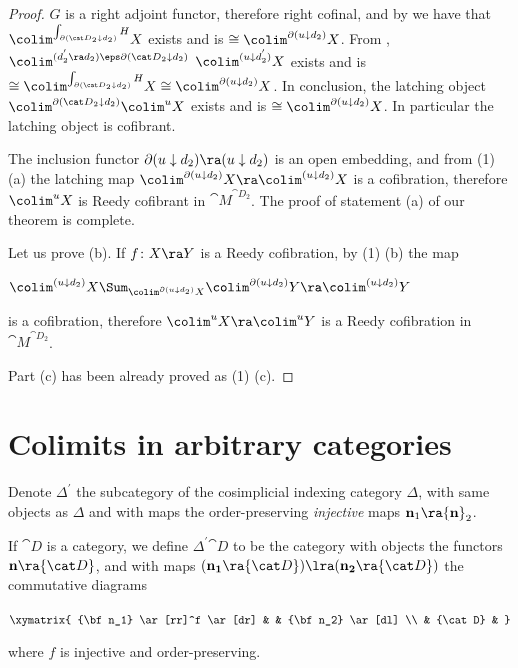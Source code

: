 \begin{proof}
$G$ is a right adjoint functor, therefore right cofinal, and by  we have that $\colim^{\int_{\partial({\cat D}_2 \downarrow d_2)} {H}} X$ exists and is $\cong \colim^{\partial(u \downarrow d_2)} X$. From , $\colim^{(d_2^{'} \ra d_2) \eps \partial({\cat D}_2 \downarrow d_2)}$ $\colim^{(u \downarrow d^{'}_2)} X$ exists and is $\cong \colim^{\int_{\partial({\cat D}_2 \downarrow d_2)} {H}} X \cong \colim^{\partial(u \downarrow d_2)} X$. In conclusion, the latching object $\colim^{\partial({\cat D}_2 \downarrow d_2)} \colim^u X$ exists and is $\cong \colim^{\partial(u \downarrow d_2)} X$. In particular the latching object is cofibrant.

The inclusion functor $\partial(u \downarrow d_2) \ra (u \downarrow d_2)$ is an open embedding, and from  (1) (a) the latching map $\colim^{\partial(u \downarrow d_2)} X \ra \colim^{(u \downarrow d_2)} X$ is a cofibration, therefore $\colim^u X$ is Reedy cofibrant in ${\cat M}^{{\cat D}_2}$. The proof of statement (a) of our theorem is complete.

Let us prove (b). If $f \colon X \ra Y$ is a Reedy cofibration, by  (1) (b) the map
\begin{center}
$\colim^{(u \downarrow d_2)} X \Sum_{\colim^{\partial(u \downarrow d_2)} X} \colim^{\partial(u \downarrow d_2)} Y \ra \colim^{(u \downarrow d_2)} Y$
\end{center}
is a cofibration, therefore $\colim^u X \ra \colim^u Y$ is a Reedy cofibration in ${\cat M}^{{\cat D}_2}$.

Part (c) has been already proved as  (1) (c).
\end{proof}

\section{Colimits in arbitrary categories}
\label{sec:colimarbitrarycat}

Denote $\Delta^{'}$ the subcategory of the cosimplicial indexing category $\Delta$, with same objects as $\Delta$ and with maps the order-preserving {\it injective} maps ${\bf n}_1 \ra {\bf n}_2$. 

If ${\cat D}$ is a category, we define $\Delta^{'}{\cat D}$ to be the category with objects the functors ${\bf n} \ra {\cat D}$, and with maps $({\bf n_1} \ra {\cat D}) \lra ({\bf n_2} \ra {\cat D})$ the commutative diagrams
\begin{center}
$ \xymatrix {
        {\bf n_1} \ar[rr]^f \ar[dr] & & {\bf n_2} \ar[dl] \\
	& {\cat D} &
	}$
\end{center}
where $f$ is injective and order-preserving.

